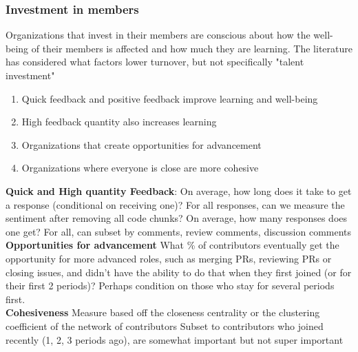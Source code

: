 \documentclass[12pt,notitlepage]{article}
\begin{document}
\subsubsection{Investment in members}
Organizations that invest in their members are conscious about how the well-being of their members is affected and how much they are learning. The literature has considered what factors lower turnover, but not specifically "talent investment"
\begin{enumerate}
\item Quick feedback and positive feedback improve learning and well-being
\item High feedback quantity also increases learning
\item Organizations that create opportunities for advancement 
\item Organizations where everyone is close are more cohesive
\end{enumerate}
\textbf{Quick and High quantity Feedback}:
On average, how long does it take to get a response (conditional on receiving one)? For all responses, can we measure the sentiment after removing all code chunks? On average, how many responses does one get? 
For all, can subset by {comments, review comments, discussion comments}\\
\textbf{Opportunities for advancement}
What \% of contributors eventually get the opportunity for more advanced roles, such as merging PRs, reviewing PRs or closing issues, and didn't have the ability to do that when they first joined (or for their first 2 periods)? Perhaps condition on those who stay for several periods first.\\
\textbf{Cohesiveness}
Measure based off the closeness centrality or the clustering coefficient of the network of contributors 
Subset to contributors who {joined recently (1, 2, 3 periods ago), are somewhat important but not super important}
\end{document}
